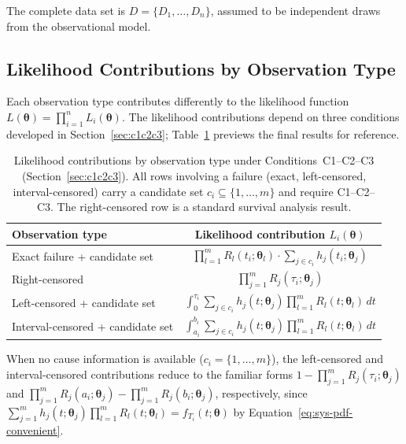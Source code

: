 \documentclass[11pt]{article}
\theoremstyle{definition}
\theoremstyle{plain}
\renewcommand{\v}[1]{\boldsymbol{#1}}
\newcommand{\btheta}{\v{\theta}}
\begin{document}
The complete data set is $D = \{D_1, \ldots, D_n\}$, assumed to be
independent draws from the observational model.

\subsection{Likelihood Contributions by Observation Type}
\label{sec:likelihood-contributions}

Each observation type contributes differently to the likelihood
function $L(\btheta) = \prod_{i=1}^n L_i(\btheta)$.
The likelihood contributions depend on three conditions developed in
Section~\ref{sec:c1c2c3}; Table~\ref{tab:likelihood-contributions}
previews the final results for reference.

\begin{table}[ht]
\centering
\caption{Likelihood contributions by observation type under
Conditions~C1--C2--C3 (Section~\ref{sec:c1c2c3}).
All rows involving a failure (exact, left-censored, interval-censored)
carry a candidate set $c_i \subseteq \{1, \ldots, m\}$ and require
C1--C2--C3.
The right-censored row is a standard survival analysis result.}
\label{tab:likelihood-contributions}
\begin{tabular}{lc}
\toprule
\textbf{Observation type} & \textbf{Likelihood contribution $L_i(\btheta)$} \\
\midrule
Exact failure + candidate set
    & $\displaystyle\prod_{l=1}^m R_l(t_i; \v{\theta}_l)
       \cdot \sum_{j \in c_i} h_j(t_i; \v{\theta}_j)$ \\[12pt]
Right-censored
    & $\displaystyle\prod_{j=1}^m R_j(\tau_i; \v{\theta}_j)$ \\[12pt]
Left-censored + candidate set
    & $\displaystyle\int_0^{\tau_i}
       \sum_{j \in c_i} h_j(t; \v{\theta}_j)
       \prod_{l=1}^m R_l(t; \v{\theta}_l) \, dt$ \\[12pt]
Interval-censored + candidate set
    & $\displaystyle\int_{a_i}^{b_i}
       \sum_{j \in c_i} h_j(t; \v{\theta}_j)
       \prod_{l=1}^m R_l(t; \v{\theta}_l) \, dt$ \\
\bottomrule
\end{tabular}
\end{table}

When no cause information is available ($c_i = \{1, \ldots, m\}$), the
left-censored and interval-censored contributions reduce to the familiar
forms $1 - \prod_{j=1}^m R_j(\tau_i; \v{\theta}_j)$ and
$\prod_{j=1}^m R_j(a_i; \v{\theta}_j) - \prod_{j=1}^m R_j(b_i; \v{\theta}_j)$, respectively, since
$\sum_{j=1}^m h_j(t; \v{\theta}_j) \prod_{l=1}^m R_l(t; \v{\theta}_l)
= f_{T_i}(t; \btheta)$ by Equation~\eqref{eq:sys-pdf-convenient}.
\end{document}
